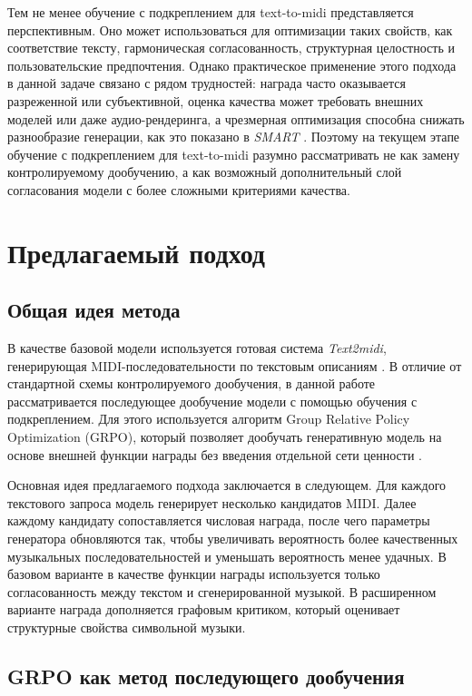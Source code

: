 \documentclass[a4paper,12pt]{extarticle}
\begin{document}
Тем не менее обучение с подкреплением для text-to-midi представляется
перспективным. Оно может использоваться для оптимизации таких свойств,
как соответствие тексту, гармоническая согласованность, структурная
целостность и пользовательские предпочтения. Однако практическое
применение этого подхода в данной задаче связано с рядом трудностей:
награда часто оказывается разреженной или субъективной, оценка качества
может требовать внешних моделей или даже аудио-рендеринга, а чрезмерная
оптимизация способна снижать разнообразие генерации, как это показано в
\textit{SMART} \cite{smart2025}. Поэтому на текущем этапе обучение с
подкреплением для text-to-midi разумно рассматривать не как замену
контролируемому дообучению, а как возможный дополнительный слой
согласования модели с более сложными критериями качества.

\section{Предлагаемый подход}

\subsection{Общая идея метода}

В качестве базовой модели используется готовая система
\textit{Text2midi}, генерирующая MIDI-последовательности по текстовым
описаниям \cite{text2midi2025}. В отличие от стандартной схемы
контролируемого дообучения, в данной работе рассматривается последующее
дообучение модели с помощью обучения с подкреплением. Для этого
используется алгоритм Group Relative Policy Optimization (GRPO), который
позволяет дообучать генеративную модель на основе внешней функции
награды без введения отдельной сети ценности \cite{deepseekmath2024}.

Основная идея предлагаемого подхода заключается в следующем. Для каждого
текстового запроса модель генерирует несколько кандидатов MIDI. Далее
каждому кандидату сопоставляется числовая награда, после чего параметры
генератора обновляются так, чтобы увеличивать вероятность более
качественных музыкальных последовательностей и уменьшать вероятность
менее удачных. В базовом варианте в качестве функции награды используется
только согласованность между текстом и сгенерированной музыкой. В
расширенном варианте награда дополняется графовым критиком, который
оценивает структурные свойства символьной музыки.

\subsection{GRPO как метод последующего дообучения}
\end{document}
